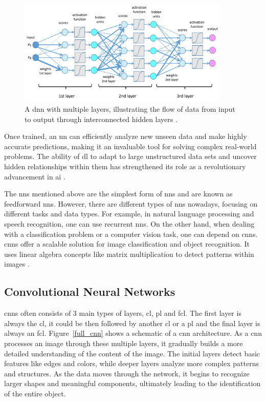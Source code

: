 \begin{figure}[!ht]
    \centering
    \includegraphics[width=0.9\textwidth]{Figures/deepLearn_2_EN.png} 
    \caption{A \gls{dnn} with multiple layers, illustrating the flow of data from input to output through interconnected hidden layers \cite{DNN_pic}.}
    \label{DNN}
\end{figure}

Once trained, an \gls{nn} can efficiently analyze new unseen data and make highly accurate predictions, making it an invaluable tool for solving complex real-world problems. The ability of \gls{dl} to adapt to large unstructured data sets and uncover hidden relationships within them has strengthened its role as a revolutionary advancement in \gls{ai} \cite{DL_VS_ML} \cite{oD_Review}.

The \gls{nn}s mentioned above are the simplest form of \gls{nn}s and are known as feedforward \gls{nn}s. However, there are different types of \gls{nn}s nowadays, focusing on different tasks and data types. For example,  in natural language processing and speech recognition, one can use recurrent \gls{nn}s. On the other hand, when dealing with a classification problem or a computer vision task, one can depend on \gls{cnn}s. \gls{cnn}s offer a scalable solution for image classification and object recognition. It uses linear algebra concepts like matrix multiplication to detect patterns within images \cite{ibm_cnn}.

\subsection{Convolutional Neural Networks}
\gls{cnn}s often consists of 3 main types of layers, \gls{cl}, \gls{pl} and \gls{fcl}. The first layer is always the \gls{cl}, it could be then followed by another \gls{cl} or a \gls{pl} and the final layer is always an \gls{fcl}. Figure~\ref{full_cnn} shows a schematic of a \gls{cnn} architecture. As a \gls{cnn} processes an image through these multiple layers, it gradually builds a more detailed understanding of the content of the image. The initial layers detect basic features like edges and colors, while deeper layers analyze more complex patterns and structures. As the data moves through the network, it begins to recognize larger shapes and meaningful components, ultimately leading to the identification of the entire object.


